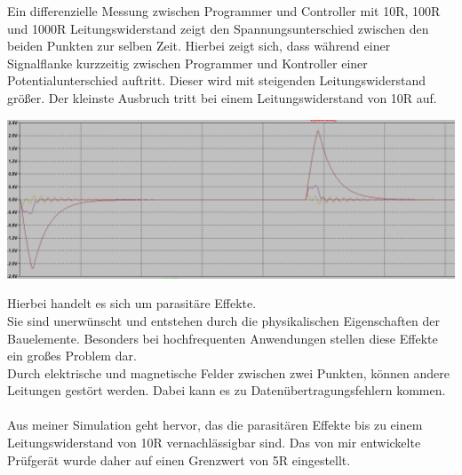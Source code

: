 \newpage

Ein differenzielle Messung zwischen Programmer und Controller mit 10R, 100R und 1000R Leitungswiderstand  zeigt den Spannungsunterschied zwischen den beiden Punkten zur selben Zeit. Hierbei zeigt sich, dass während einer Signalflanke kurzzeitig zwischen Programmer und Kontroller einer Potentialunterschied auftritt. Dieser wird mit steigenden Leitungswiderstand größer. Der kleinste Ausbruch tritt bei einem Leitungswiderstand von 10R auf.


\begin{center}
\includegraphics[width=17cm]{Bilder/LTC-SIGNALVERLAUF2.png}
\end{center}

Hierbei handelt es sich um parasitäre Effekte. 
\\
Sie sind unerwünscht und entstehen durch die physikalischen Eigenschaften der Bauelemente. Besonders bei hochfrequenten Anwendungen stellen diese Effekte ein großes Problem dar.
\\
Durch elektrische und magnetische Felder zwischen zwei Punkten, können andere Leitungen gestört werden. Dabei kann es zu Datenübertragungsfehlern kommen.
\\
\\
Aus meiner Simulation geht hervor, das die parasitären Effekte bis zu einem Leitungswiderstand von 10R vernachlässigbar sind. Das von mir entwickelte Prüfgerät wurde daher auf einen Grenzwert von 5R eingestellt. 

